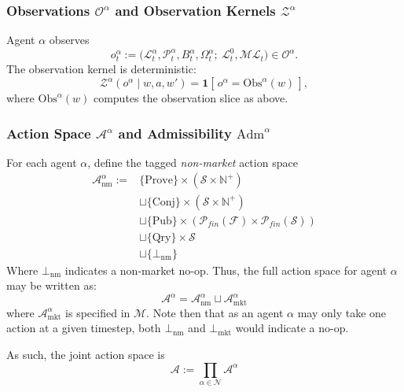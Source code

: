 \subsubsection{Observations $\mathcal{O}^\alpha$ and Observation Kernels $\mathcal{Z}^\alpha$}


Agent $\alpha$ observes
\[
o^\alpha_t :=
\big(\mathcal{L}^\alpha_t,\mathcal{P}^\alpha_t,B^\alpha_t, \Omega_t^\alpha;\ \mathcal{L}^0_t,\mathcal{ML}_t\big)%
\in\mathcal{O}^\alpha.
\]
The observation kernel is deterministic:
\[
\mathcal{Z}^\alpha(o^\alpha\mid w,a,w')=\mathbf{1}[\,o^\alpha=\mathrm{Obs}^\alpha(w)\,],
\]
where $\mathrm{Obs}^\alpha(w)$ computes the observation slice as above.


\subsubsection{Action Space $\mathcal{A}^\alpha$ and Admissibility $\mathrm{Adm}^\alpha$}

For each agent $\alpha$, define the tagged \textit{non-market} action space
\begin{align*}
\mathcal{A}_{\mathrm{nm}}^\alpha
:=
&
\{\mathrm{Prove}\}\times(\mathcal{S}\times\mathbb{N}^+)
\\&\sqcup
\{\mathrm{Conj}\}\times(\mathcal{S}\times\mathbb{N}^+)
\\&\sqcup
\{\mathrm{Pub}\}\times(\mathcal{P}_{fin}(\mathcal{F})\times \mathcal{P}_{fin}(\mathcal{S}))
\\&\sqcup
\{\mathrm{Qry}\}\times \mathcal{S}
\\&\sqcup\{\bot_{\mathrm{nm}}\}
\end{align*}
Where $\bot_{\mathrm{nm}}$ indicates a non-market no-op. Thus, the full action space for agent $\alpha$ may be written as:
\[
\mathcal{A}^\alpha = \mathcal{A}^\alpha_{\mathrm{nm}} \sqcup \mathcal{A}^\alpha_{\mathrm{mkt}}
\]
where $\mathcal{A}^\alpha_{\mathrm{mkt}}$ is specified in $\mathscr{M}$. Note then that as an agent $\alpha$ may only take one action at a given timestep, both $\bot_{\mathrm{nm}}$ and $\bot_{\mathrm{mkt}}$ would indicate a no-op.

As such, the joint action space is 
\[\mathcal{A}:=\prod_{\alpha\in\mathcal{N}}\mathcal{A}^\alpha\]


